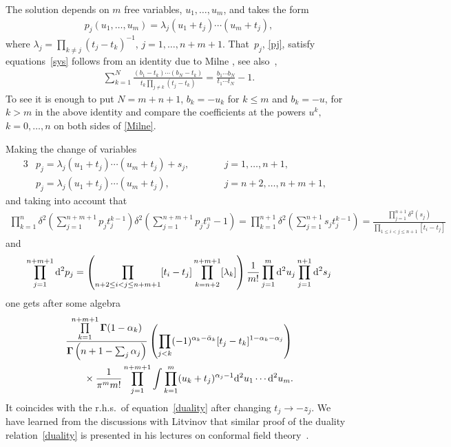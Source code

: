 \documentclass[pdftex]{sigma}
\numberwithin{equation}{section}
\begin{document}
The solution depends on $m$ free variables, $u_1,\ldots, u_m$, and takes the form
\begin{gather}\label{pj}
p_j(u_1,\ldots,u_m) = \lambda_j (u_1+t_j)\cdots(u_m+t_j),
\end{gather}
where $\lambda_j=\prod\limits_{k\neq j} (t_j-t_k)^{-1}$, $j=1,\ldots,n+m+1$. That~$p_j$, \eqref{pj}, satisfy equations~\eqref{sys} follows from an identity due to Milne \cite[Lemma~1.33]{MR812934}, see also~\cite[equation~(2.3)]{MR2026866},
\begin{gather}\label{Milne}
\sum_{k=1}^N \frac{(b_1-t_k)\cdots(b_N-t_k)} {t_k\prod\limits_{j\neq k}(t_j-t_k)} = \frac{b_1\cdots b_N}{t_1\cdots t_N} -1 .
\end{gather}
To see it is enough to put $N=m+n+1$, $b_k =-u_k$ for $k\leq m$ and $b_{k}=-u$, for $k>m$ in the above identity and compare the coefficients at the powers $u^k,$ $k=0,\ldots,n$ on both sides of \eqref{Milne}.

Making the change of variables
\begin{alignat*}{3}
&p_j= \lambda_j (u_1+t_j)\cdots(u_m+t_j) +s_j,\qquad && j=1,\ldots,n+1, &\\
&p_j=\lambda_j (u_1+t_j)\cdots(u_m+t_j),\qquad && j=n+2,\ldots, n+m+1,&
\end{alignat*}
and taking into account that
\begin{gather*}
 \prod_{k=1}^{n}\delta^2\left(\sum_{j=1}^{n+m+1} p_j t_j^{k-1}\right)\delta^2
\left(\sum_{j=1}^{n+m+1} p_j t_j^{n}-1\right) =
 \prod_{k=1}^{n+1}\delta^2\left(\sum_{j=1}^{n+1} s_j t_j^{k-1}\right) =
\frac{\prod\limits_{j=1}^{n+1}\delta^2\left(s_j\right)}
{\prod\limits_{1\leq i<j\leq n+1} [t_i-t_j]}
\end{gather*}
and
\begin{gather*}
\prod_{j=1}^{n+m+1} {\rm d}^2 p_j =\left(
 \prod_{n+2\leq i<j\leq n+m+1}[t_i-t_j] \prod_{k=n+2}^{n+m+1}[\lambda_{k}]\right)
\frac1{m!}\prod_{j=1}^{m} {\rm d}^2 u_j \prod_{j=1}^{n+1} {\rm d}^2 s_j
\end{gather*}
one gets after some algebra
\begin{gather*}
\frac{\prod\limits_{k=1}^{n+m+1} \boldsymbol\Gamma(1-\alpha_k)}{\boldsymbol\Gamma\left(n+1-\sum_j \alpha_j\right)}
\left(\prod_{j<k}(-1)^{\alpha_k-\bar\alpha_k}[t_j-t_k]^{1-\alpha_k-\alpha_j}\right)\\
\qquad{} \times \frac1{\pi^m m!}\prod_{j=1}^{n+m+1}\int\prod_{k=1}^m (u_k+t_j)^{\alpha_j-1}{\rm d}^2u_1\cdots {\rm d}^2u_{m}.
\end{gather*}
It coincides with the r.h.s.\ of equation~\eqref{duality} after changing $t_j\to -z_j$. We have learned from the discussions with Litvinov that similar proof of the duality relation~\eqref{duality} is presented in his lectures on conformal field theory~\cite{Litvinov}.
\end{document}
